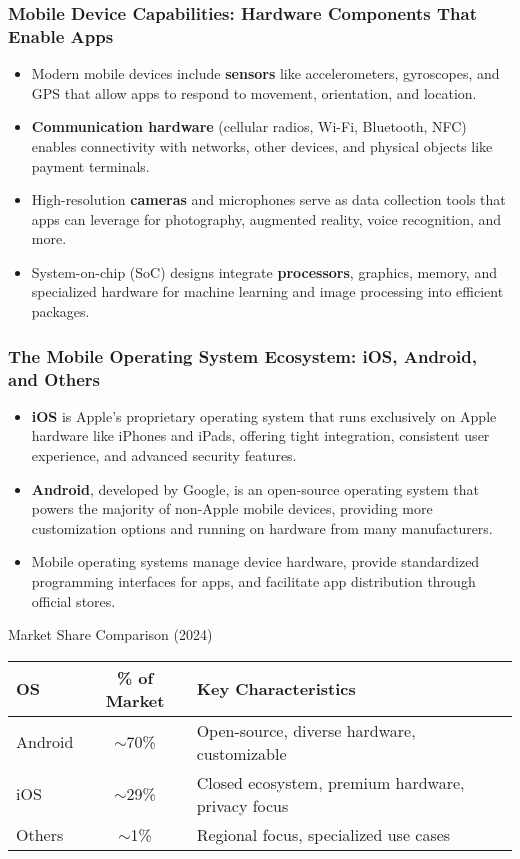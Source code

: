 \documentclass{beamer}
\begin{document}
	\begin{frame}[fragile]
		\frametitle{Mobile Device Capabilities: Hardware Components That Enable Apps}
		
		\begin{itemize}
			\item Modern mobile devices include \textbf{sensors} like accelerometers, gyroscopes, and GPS that allow apps to respond to movement, orientation, and location.
			\item \textbf{Communication hardware} (cellular radios, Wi-Fi, Bluetooth, NFC) enables connectivity with networks, other devices, and physical objects like payment terminals.
			\item High-resolution \textbf{cameras} and microphones serve as data collection tools that apps can leverage for photography, augmented reality, voice recognition, and more.
			\item System-on-chip (SoC) designs integrate \textbf{processors}, graphics, memory, and specialized hardware for machine learning and image processing into efficient packages.
		\end{itemize}
		
	\end{frame}
	
	\begin{frame}
		\frametitle{The Mobile Operating System Ecosystem: iOS, Android, and Others}
		
		\begin{itemize}
			\item \textbf{iOS} is Apple's proprietary operating system that runs exclusively on Apple hardware like iPhones and iPads, offering tight integration, consistent user experience, and advanced security features.
			\item \textbf{Android}, developed by Google, is an open-source operating system that powers the majority of non-Apple mobile devices, providing more customization options and running on hardware from many manufacturers.
			\item Mobile operating systems manage device hardware, provide standardized programming interfaces for apps, and facilitate app distribution through official stores.
		\end{itemize}
		
		\begin{block}{\scriptsize{Market Share Comparison (2024)}}
			\scriptsize{
				\begin{tabular}{|l|c|l|}
					\hline
					\textbf{OS} & \textbf{\% of Market} & \textbf{Key Characteristics} \\
					\hline
					Android & $\sim$70\% & Open-source, diverse hardware, customizable \\
					\hline
					iOS & $\sim$29\% & Closed ecosystem, premium hardware, privacy focus \\
					\hline
					Others & $\sim$1\% & Regional focus, specialized use cases \\
					\hline
				\end{tabular}
			}
		\end{block}
		
	\end{frame}
	
\end{document}
